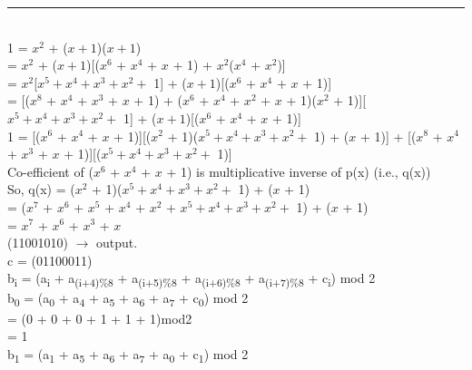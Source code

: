 \documentclass[11pt]{article}
\newcommand*{\xdash}[1][3em]{\rule[0.5ex]{#1}{0.55pt}}
\begin{document}
	\hspace*{7.2cm} \xdash[3.5em]\\
	1 = $x^2$ + ($x + 1$)($x + 1$)\\
	\hspace{0.3cm}= $x^2$ + ($x + 1$)[($x^6$ + $x^4$ + $x$ + 1) + $x^2$($x^4$ + $x^2$)]\\
	\hspace{0.3cm}= $x^2$[$x^5 + x^4 + x^3 + x^2 +$ 1] + ($x + 1$)[($x^6$ + $x^4$ + $x$ + 1)]\\
	\hspace{0.3cm}= [($x^8$ + $x^4$ + $x^3$ + $x$ + 1) + ($x^6$ + $x^4$ + $x^2$ + $x$ + 1)($x^2$ + 1)][$x^5 + x^4 + x^3 + x^2 +$ 1] + \hspace*{0.8cm}($x + 1$)[($x^6$ + $x^4$ + $x$ + 1)] \\
	1 = [($x^6$ + $x^4$ + $x$ + 1)][($x^2$ + 1)($x^5 + x^4 + x^3 + x^2 +$ 1) + ($x$ + 1)] + [($x^8$ + $x^4$ + $x^3$ + $x$ + \hspace*{0.8cm}1)][($x^5 + x^4 + x^3 + x^2 +$ 1)]\vspace{0.2cm}\\
	Co-efficient of ($x^6$ + $x^4$ + $x$ + 1) is multiplicative inverse of p(x) (i.e., q(x))\\
	So, q(x) = ($x^2$ + 1)($x^5 + x^4 + x^3 + x^2 +$ 1) + ($x$ + 1)\\
	\hspace{1.5cm}= ($x^7$ + $x^6$ + $x^5$ + $x^4$ + $x^2$ + $x^5 + x^4 + x^3 + x^2 +$ 1) + ($x$ + 1)\\
	\hspace{1.5cm}= $x^7$ + $x^6$ + $x^3$ + $x$\\
	(11001010) $\rightarrow$ output.\\
	c = (01100011)\\
	b\textsubscript{i} = (a\textsubscript{i} + a\textsubscript{(i+4)\%8} + a\textsubscript{(i+5)\%8} + a\textsubscript{(i+6)\%8} + a\textsubscript{(i+7)\%8} + c\textsubscript{i}) mod 2\\
	b\textsubscript{0} = (a\textsubscript{0} + a\textsubscript{4} + a\textsubscript{5} + a\textsubscript{6} + a\textsubscript{7} + c\textsubscript{0}) mod 2\\
	\hspace{0.55cm}= (0 + 0 + 0 + 1 + 1 + 1)mod2\\
	\hspace{0.55cm}= 1\\
	b\textsubscript{1} = (a\textsubscript{1} + a\textsubscript{5} + a\textsubscript{6} + a\textsubscript{7} + a\textsubscript{0} + c\textsubscript{1}) mod 2\\
\end{document}
